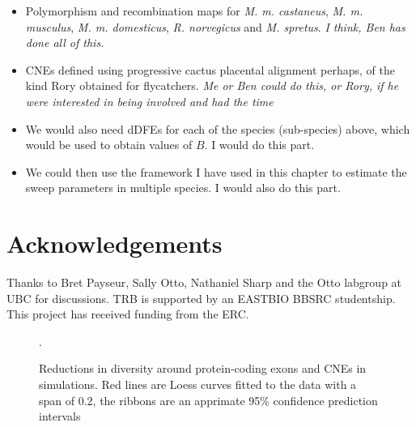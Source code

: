 \documentclass[11pt]{article}
\newcommand{\beginsupplement}{%
        \setcounter{table}{0}
        \renewcommand{\thetable}{S\arabic{table}}%
        \setcounter{figure}{0}
        \renewcommand{\thefigure}{S\arabic{figure}}%
     }
\begin{document}
\begin{itemize}

\item Polymorphism and recombination maps for \textit{M. m. castaneus}, \textit{M. m. musculus}, \textit{M. m. domesticus}, \textit{R. norvegicus} and \textit{M. spretus}. \textit{I think, Ben has done all of this.}

\item CNEs defined using progressive cactus placental alignment perhaps, of the kind Rory obtained for flycatchers. \textit{Me or Ben could do this, or Rory, if he were interested in being involved and had the time}

\item We would also need dDFEs for each of the species (sub-species) above, which would be used to obtain values of $B$. I would do this part.

\item We could then use the framework I have used in this chapter to estimate the sweep parameters in multiple species. I would also do this part.


\end{itemize}



\section*{Acknowledgements}

Thanks to Bret Payseur, Sally Otto, Nathaniel Sharp and the Otto labgroup at UBC for discussions. TRB is supported by an EASTBIO BBSRC studentship. This project has received funding from the ERC.

 
%

\beginsupplement

\newpage










\begin{figure}[h]
   \centering      
   \noindent{}
 \caption{Reductions in diversity around protein-coding exons and CNEs in simulations. Red lines are Loess curves fitted to the data with a span of 0.2, the ribbons are an apprimate 95\% confidence prediction intervals}.
 
 \label{fig:BGSLoess}
\end{figure}
\end{document}
